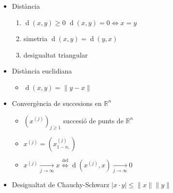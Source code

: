 \documentclass{article}
\newcommand{\R}{\mathbb{R}}
\DeclareMathOperator{\distancia}{d}
\begin{document}
\begin{itemize}
\item Distància
	\begin{enumerate}
	\item $\distancia (x, y) \ge 0$
		\subitem $\distancia (x, y) = 0 \Leftrightarrow x = y$
	\item simetria $\distancia (x, y) = \distancia(y, x)$
	\item desigualtat triangular
	\end{enumerate}

\item Distància euclidiana
	\begin{itemize}
	\item $\distancia(x, y) = \|y - x\|$
	\end{itemize}

\item Convergència de succesions en $\R^n$
	\begin{itemize}
	\item $(x^{(j)})_{j \ge 1}$ succesió de punts de $\R^n$
	\item $x^{(j)} = (x^{(j)}_{1-n,})$
	\item $x^{(j)} \underset{j \to \infty}{\to} x \overset{\text{def}}{\Leftrightarrow} \distancia(x^{(j)}, x) \underset{j \to \infty}{\to} 0$
	\end{itemize}

\item Desigualtat de Chauchy-Schwarz
	\subitem $|x\cdot y| \le \|x\|\|y\|$
\end{itemize}
\end{document}
